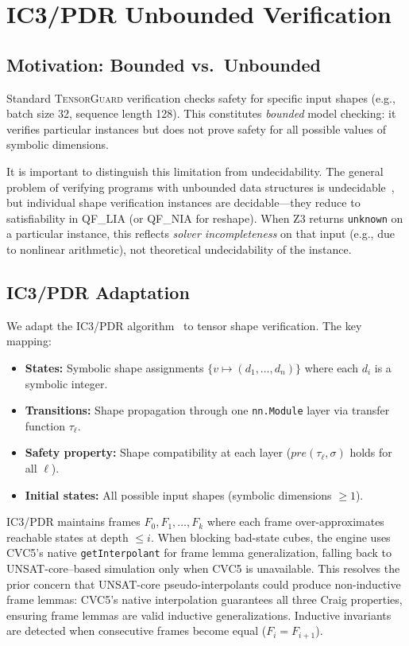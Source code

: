 \documentclass[11pt]{article}
\begin{document}
\section{IC3/PDR Unbounded Verification}\label{sec:ic3}

\subsection{Motivation: Bounded vs.\ Unbounded}

Standard \textsc{TensorGuard} verification checks safety for
specific input shapes (e.g., batch size 32, sequence length 128).
This constitutes \emph{bounded} model checking: it verifies
particular instances but does not prove safety for all possible
values of symbolic dimensions.

It is important to distinguish this limitation from undecidability.
The general problem of verifying programs with unbounded data
structures is undecidable~\cite{rice53}, but individual shape
verification instances are decidable---they reduce to satisfiability
in QF\_LIA (or QF\_NIA for reshape).  When Z3 returns
\texttt{unknown} on a particular instance, this reflects
\emph{solver incompleteness} on that input (e.g., due to nonlinear
arithmetic), not theoretical undecidability of the instance.

\subsection{IC3/PDR Adaptation}

We adapt the IC3/PDR algorithm~\cite{bradley11,een11} to tensor
shape verification.  The key mapping:
\begin{itemize}[leftmargin=2em]
  \item \textbf{States:} Symbolic shape assignments
    $\{v \mapsto (d_1, \ldots, d_n)\}$ where each $d_i$ is a
    symbolic integer.
  \item \textbf{Transitions:} Shape propagation through one
    \texttt{nn.Module} layer via transfer function $\tau_\ell$.
  \item \textbf{Safety property:} Shape compatibility at each
    layer ($\mathit{pre}(\tau_\ell, \sigma)$ holds for all $\ell$).
  \item \textbf{Initial states:} All possible input shapes
    (symbolic dimensions $\geq 1$).
\end{itemize}

IC3/PDR maintains frames $F_0, F_1, \ldots, F_k$ where each
frame over-approximates reachable states at depth $\leq i$.
When blocking bad-state cubes, the engine uses CVC5's native
\texttt{getInterpolant} for frame lemma generalization, falling
back to UNSAT-core--based simulation only when CVC5 is unavailable.
This resolves the prior concern that UNSAT-core pseudo-interpolants
could produce non-inductive frame lemmas: CVC5's native interpolation
guarantees all three Craig properties, ensuring frame lemmas
are valid inductive generalizations.
Inductive invariants are detected when consecutive
frames become equal ($F_i = F_{i+1}$).
\end{document}
